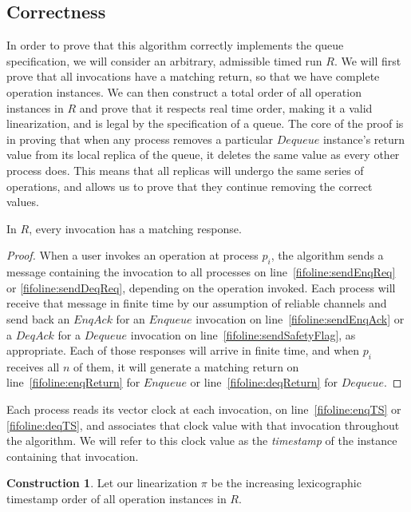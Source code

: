 \documentclass[a4paper,anonymous,USenglish]{lipics-v2021}
\theoremstyle{definition}
\newtheorem{construction}{Construction}
\begin{document}
\subsection{Correctness}\label{sec:fifoCorrectness}
In order to prove that this algorithm correctly implements the queue specification, we will consider an arbitrary, admissible timed run $R$.  We will first prove that all invocations have a matching return, so that we have complete operation instances.  We can then construct a total order of all operation instances in $R$ and prove that it respects real time order, making it a valid linearization, and is legal by the specification of a queue.  The core of the proof is in proving that when any process removes a particular $Dequeue$ instance's return value from its local replica of the queue, it deletes the same value as every other process does.  This means that all replicas will undergo the same series of operations, and allows us to prove that they continue removing the correct values.  

\begin{lemma}\label{fifolem:responses}
  In $R$, every invocation has a matching response.
\end{lemma}

\begin{proof}
When a user invokes an operation at process $p_i$, the algorithm sends a message containing the invocation to all processes on line~\ref{fifoline:sendEnqReq} or \ref{fifoline:sendDeqReq}, depending on the operation invoked.  Each process will receive that message in finite time by our assumption of reliable channels and send back an $EnqAck$ for an $Enqueue$ invocation on line~\ref{fifoline:sendEnqAck} or a $DeqAck$ for a $Dequeue$ invocation on line~\ref{fifoline:sendSafetyFlag}, as appropriate.  Each of those responses will arrive in finite time, and when $p_i$ receives all $n$ of them, it will generate a matching return on line~\ref{fifoline:enqReturn} for $Enqueue$ or line~\ref{fifoline:deqReturn} for $Dequeue$.
\end{proof}

Each process reads its vector clock at each invocation, on line~\ref{fifoline:enqTS} or \ref{fifoline:deqTS}, and associates that clock value with that invocation throughout the algorithm.  We will refer to this clock value as the \emph{timestamp} of the instance containing that invocation.

\begin{construction}\label{constr:fifo}
  Let our linearization $\pi$ be the increasing lexicographic timestamp order of all operation instances in $R$.
\end{construction}
\end{document}
